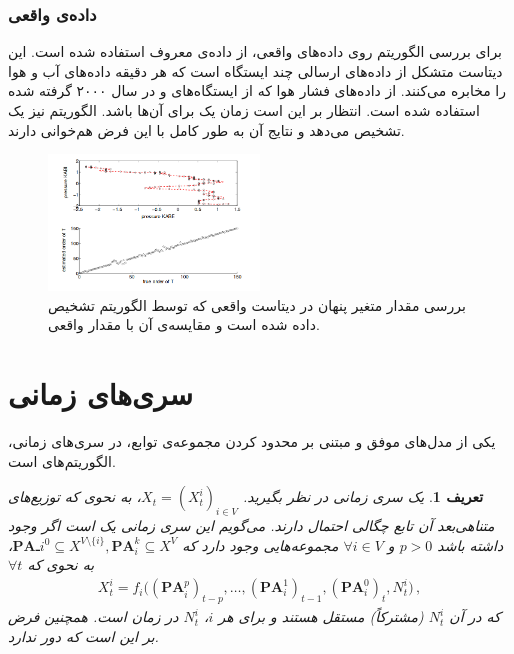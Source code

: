 \documentclass[a4paper,12pt]{article}
\newtheorem{den}{{\large\bf تعریف}}[section]
\newcommand{\eps}{{N}}
\begin{document}
\subsubsection{داده‌ی واقعی}
برای بررسی الگوریتم روی داده‌‌های واقعی، از داده‌ی معروف
استفاده شده است. این دیتاست‌ متشکل از داده‌های ارسالی چند ایستگاه است که هر دقیقه داده‌های آب و هوا را مخابره می‌کنند. از داده‌های فشار هوا که از ایستگاه‌های 
و
در سال ۲۰۰۰ گرفته شده استفاده شده است. انتظار بر این است زمان یک 
برای آن‌ها باشد. الگوریتم نیز یک 
تشخیص می‌دهد و نتایج آن به طور کامل با این فرض هم‌‌خوانی دارند. 

\begin{figure}[h!]
	\begin{center}
		\includegraphics[width=0.5\textwidth]{kabe.png}
		\caption{
			بررسی مقدار متغیر پنهان در دیتاست واقعی که توسط الگوریتم تشخیص داده شده است و مقایسه‌ی آن با مقدار واقعی. 
		}
	\end{center}
\end{figure}

\section{سری‌های زمانی}
یکی از مدل‌های موفق و مبتنی بر محدود کردن مجموعه‌ی توابع، در سری‌های زمانی، الگوریتم‌های 
است.
\begin{den} \label{def:timino}
	یک سری زمانی در نظر بگیرید.
	$X_t=(X^i_t)_{i \in V}$،
	به نحوی که توزیع‌های متناهی‌بعد آن تابع چگالی احتمال دارند. می‌گویم این سری زمانی یک 
	است اگر وجود داشته باشد
$p>0$ 
و 
$\forall i \in V$ 
مجموعه‌هایی وجود دارد که
 $\textbf{PA}ـ{i}^{0} \subseteq X^{V\setminus\{i\}}, \textbf{PA}_{i}^{k} \subseteq X^V$، 
 به نحوی که 
  $\forall t$
	\begin{align} \label{anm}
	X^i_t = f_{i}\big((\textbf{PA}_i^p)_{t-p}, \ldots, (\textbf{PA}_i^1)_{t-1}, (\textbf{PA}_{i}^{0})_{t}, \eps^i_t\big)\,,
	\end{align}
که در آن 
$\eps^i_t$ 
(مشترکاً) مستقل هستند و برای هر $i$،
$\eps^i_t$ 
در زمان 
است. همچنین فرض بر این است که 
دور ندارد.
\end{den}
\end{document}
